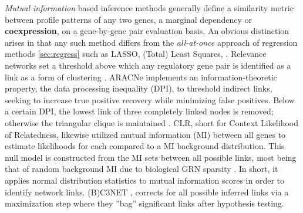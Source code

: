 \emph{Mutual information} based inference methods generally define a similarity metric between profile patterns of any two genes, a marginal dependency or \textbf{coexpression}, on a gene-by-gene pair evaluation basis. An obvious distinction arises in that any such method differs from the {\it all-at-once} approach of regression methods \cref{sec:regress} such as LASSO, (Total) Least Squares, \etc. Relevance networks set a threshold above which any regulatory gene pair is identified as a link as a form of clustering \citep{faith2007large}. ARACNe implements an information-theoretic property, the data processing inequality (DPI), to threshold indirect links, seeking to increase true positive recovery while minimizing false positives. Below a certain DPI, the lowest link of three completely linked nodes is removed; otherwise the triangular clique is maintained \citep{montes2014aracne}. CLR, short for Context Likelihood of Relatedness, likewise utilized mutual information (MI) between all genes to estimate likelihoods for each compared to a MI background distribution. This null model is constructed from the MI sets between all possible links, most being that of random background MI due to biological GRN sparsity \citep{faith2007large}. In short, it applies normal distribution statistics to mutual information scores in order to identify network links. (B)C3NET \citep{altay2010inferring},\citep{de2012bagging} corrects for all possible inferred links via a maximization step where they ''bag'' significant links after hypothesis testing.





